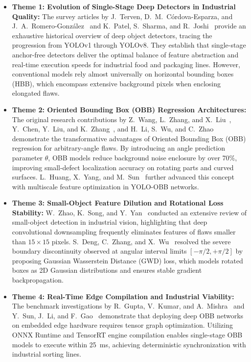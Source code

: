 \begin{itemize}
\item \textbf{Theme 1: Evolution of Single-Stage Deep Detectors in Industrial Quality:} The survey articles by J.~Terven, D.~M.~C{\'o}rdova-Esparza, and J.~A.~Romero-Gonz{\'a}lez~\cite{terven2023yolo} and K.~Patel, S.~Sharma, and R.~Joshi~\cite{patel2023deep} provide an exhaustive historical overview of deep object detectors, tracing the progression from YOLOv1 through YOLOv8. They establish that single-stage anchor-free detectors deliver the optimal balance of feature abstraction and real-time execution speeds for industrial food and packaging lines. However, conventional models rely almost universally on horizontal bounding boxes (HBB), which encompass extensive background pixels when enclosing elongated flaws.
\item \textbf{Theme 2: Oriented Bounding Box (OBB) Regression Architectures:} The original research contributions by Z.~Wang, L.~Zhang, and X.~Liu~\cite{wang2024rgs}, Y.~Chen, Y.~Liu, and K.~Zhang~\cite{chen2025obb}, and H.~Li, S.~Wu, and C.~Zhao~\cite{li2024pv} demonstrate the transformative advantages of Oriented Bounding Box (OBB) regression for arbitrary-angle flaws. By introducing an angle prediction parameter $\theta$, OBB models reduce background noise enclosure by over 70\%, improving small-defect localization accuracy on rotating parts and curved surfaces. L.~Huang, X.~Yang, and M.~Sun~\cite{huang2026msfe} further advanced this concept with multiscale feature optimization in YOLO-OBB networks.
\item \textbf{Theme 3: Small-Object Feature Dilution and Rotational Loss Stability:} W.~Zhao, K.~Song, and Y.~Yan~\cite{zhao2024small} conducted an extensive review of small-object detection in industrial vision, highlighting that deep convolutional downsampling frequently eliminates features of flaws smaller than $15 \times 15$ pixels. S.~Deng, C.~Zhang, and X.~Wu~\cite{deng2024probiou} resolved the severe boundary discontinuity observed at angular interval limits $[-\pi/2, +\pi/2]$ by proposing Gaussian Wasserstein Distance (GWD) loss, which models rotated boxes as 2D Gaussian distributions and ensures stable gradient backpropagation.
\item \textbf{Theme 4: Real-Time Edge Compilation and Industrial Viability:} The benchmark investigations by R.~Gupta, V.~Kumar, and A.~Mishra~\cite{gupta2024benchmark} and Y.~Sun, J.~Li, and F.~Gao~\cite{sun2026edgedeployable} demonstrate that deploying deep OBB networks on embedded edge hardware requires tensor graph optimization. Utilizing ONNX Runtime and TensorRT engine compilation enables single-stage OBB models to execute within 25~ms, achieving deterministic synchronization with industrial sorting lines.
\end{itemize}

